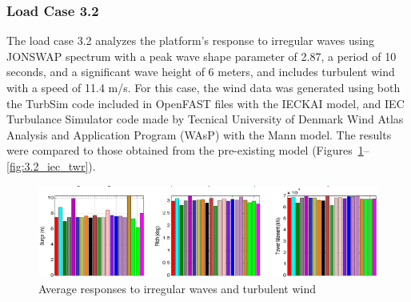 \documentclass[a4paper, 11pt]{article}
\begin{document}
\subsubsection{Load Case 3.2}  
\hspace*{0.5cm}The load case 3.2 analyzes the platform’s response to irregular waves using JONSWAP spectrum with a peak wave shape parameter of 2.87, a period of 10 seconds, and a significant wave height of 6 meters, and includes turbulent wind with a speed of 11.4 m/s. For this case, the wind data was generated using both the TurbSim code included in OpenFAST files with the IECKAI model, and IEC Turbulance Simulator code made by Tecnical University of Denmark Wind Atlas Analysis and Application Program (WAsP) with the Mann model. The results were compared to those obtained from the pre-existing model (Figures~\ref{fig:3.2_ref}--\ref{fig:3.2_iec_twr}).

\begin{figure}[H]
    \centering
    \includegraphics[width=1\textwidth]{3.2_ref.png}
    \caption{\small Average responses to irregular waves and turbulent wind \cite{Robertson2014}}
    \label{fig:3.2_ref}
\end{figure}
\end{document}
